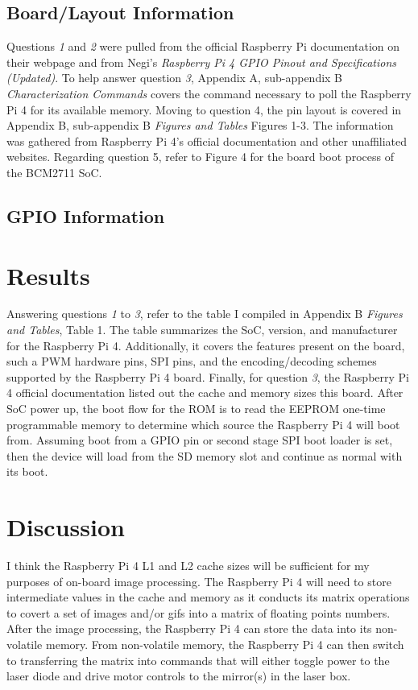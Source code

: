 \documentclass[journal]{IEEEtran}
\begin{document}
    \subsection{Board/Layout Information}
    Questions \emph{1} and \emph{2} were pulled from the official Raspberry Pi documentation on their webpage and from Negi's \emph{Raspberry Pi 4 GPIO Pinout and Specifications (Updated)}.
    To help answer question \emph{3}, Appendix A, sub-appendix B \emph{Characterization Commands} covers the command necessary to poll the Raspberry Pi 4 for its available memory.
    Moving to question 4, the pin layout is covered in Appendix B, sub-appendix B \emph{Figures and Tables} Figures 1-3. 
    The information was gathered from Raspberry Pi 4's official documentation and other unaffiliated websites.
    Regarding question 5, refer to Figure 4 for the board boot process of the BCM2711 SoC.

    \subsection{GPIO Information}
    \section{Results}
    Answering questions \emph{1} to \emph{3}, refer to the table I compiled in Appendix B \emph{Figures and Tables}, Table 1. 
    The table summarizes the SoC, version, and manufacturer for the Raspberry Pi 4.
    Additionally, it covers the features present on the board, such a PWM hardware pins, SPI pins, and the encoding/decoding schemes supported by the Raspberry Pi 4 board.
    Finally, for question \emph{3}, the Raspberry Pi 4 official documentation listed out the cache and memory sizes this board.
    After SoC power up, the boot flow for the ROM is to read the EEPROM one-time programmable memory to determine which source the Raspberry Pi 4 will boot from.
    Assuming boot from a GPIO pin or second stage SPI boot loader is set, then the device will load from the SD memory slot and continue as normal with its boot. 
    \section{Discussion}
    I think the Raspberry Pi 4 L1 and L2 cache sizes will be sufficient for my purposes of on-board image processing. 
    The Raspberry Pi 4 will need to store intermediate values in the cache and memory as it conducts its matrix operations to covert a set of images and/or gifs into a matrix of floating points numbers.
    After the image processing, the Raspberry Pi 4 can store the data into its non-volatile memory.
    From non-volatile memory, the Raspberry Pi 4 can then switch to transferring the matrix into commands that will either toggle power to the laser diode and drive motor controls to the mirror(s) in the laser box. 
    
\end{document}
